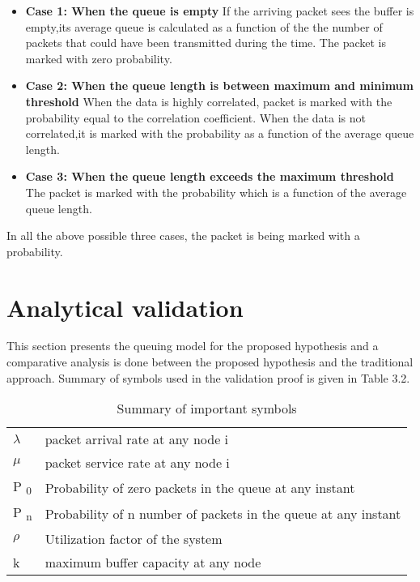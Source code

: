     \begin{itemize}
        \item {\bf Case 1: When the queue is empty}
            \newline If the arriving packet sees the buffer is empty,its average queue is calculated as a function of the the number of packets that could have been transmitted during the time. The packet is marked with zero probability.
        \item {\bf Case 2: When the queue length is between maximum and minimum threshold}
        \newline
         When the data is highly correlated, packet is marked with the probability equal to the correlation coefficient. 
         \newline When the data is not correlated,it is marked with the probability as a function of the average queue length.
       \item {\bf Case 3: When the queue length exceeds the maximum threshold} 
    \newline The packet is marked with the probability which is a function of the average queue length. 
\end{itemize}
In all the above possible three cases, the packet is being marked with a probability. 
\section{Analytical validation}
This section presents the queuing model for the proposed hypothesis and a comparative analysis is done between the proposed hypothesis and the traditional approach. Summary of symbols used in the validation proof is given in Table 3.2.
\begin{table}[h]
\begin{center}
\caption{Summary of important symbols}
\begin{tabular}{p{1.0cm} p{10.0cm} }
\hline
 $\lambda$ & packet arrival rate at any node i \\ 
 $\mu$ & packet service rate at any  node i\\
 P \textsubscript{0} & Probability of zero packets in the queue at any instant\\
  P \textsubscript{n} & Probability of n number of packets in the queue at any instant\\
 $\rho$ & Utilization factor of the system\\
 k & maximum buffer capacity at any node\\
\hline
\end{tabular}
\end{center}
\end{table}

